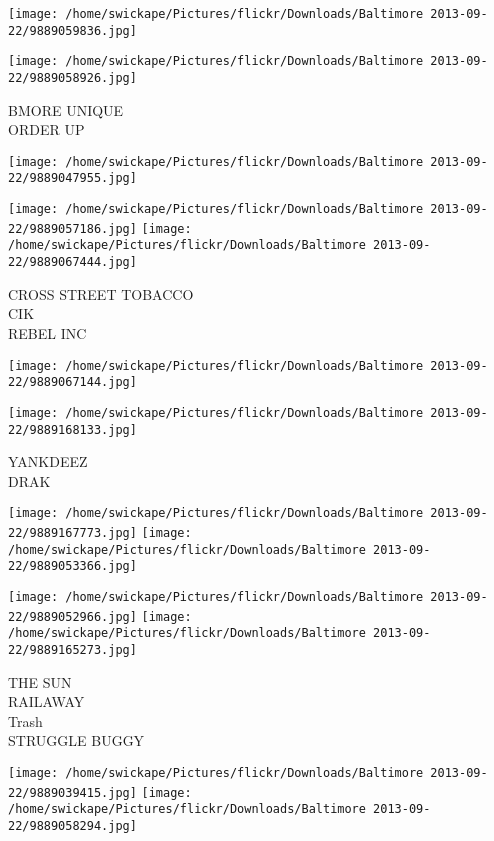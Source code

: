 \documentclass[10pt,letterpaper]{article}
\begin{document}
\texttt{[image: /home/swickape/Pictures/flickr/Downloads/Baltimore 2013-09-22/9889059836.jpg]}

\vspace{0.25in}
\texttt{[image: /home/swickape/Pictures/flickr/Downloads/Baltimore 2013-09-22/9889058926.jpg]}

BMORE UNIQUE\\
ORDER UP\\
\pagebreak

\texttt{[image: /home/swickape/Pictures/flickr/Downloads/Baltimore 2013-09-22/9889047955.jpg]}

\vspace{0.25in}
\texttt{[image: /home/swickape/Pictures/flickr/Downloads/Baltimore 2013-09-22/9889057186.jpg]}
\texttt{[image: /home/swickape/Pictures/flickr/Downloads/Baltimore 2013-09-22/9889067444.jpg]}

CROSS STREET TOBACCO\\
CIK\\
REBEL INC\\
\pagebreak

\texttt{[image: /home/swickape/Pictures/flickr/Downloads/Baltimore 2013-09-22/9889067144.jpg]}

\vspace{0.25in}
\texttt{[image: /home/swickape/Pictures/flickr/Downloads/Baltimore 2013-09-22/9889168133.jpg]}

YANKDEEZ\\
DRAK\\
\pagebreak

\texttt{[image: /home/swickape/Pictures/flickr/Downloads/Baltimore 2013-09-22/9889167773.jpg]}
\texttt{[image: /home/swickape/Pictures/flickr/Downloads/Baltimore 2013-09-22/9889053366.jpg]}

\texttt{[image: /home/swickape/Pictures/flickr/Downloads/Baltimore 2013-09-22/9889052966.jpg]}
\texttt{[image: /home/swickape/Pictures/flickr/Downloads/Baltimore 2013-09-22/9889165273.jpg]}

THE SUN\\
RAILAWAY\\
Trash\\
STRUGGLE BUGGY\\
\pagebreak

\texttt{[image: /home/swickape/Pictures/flickr/Downloads/Baltimore 2013-09-22/9889039415.jpg]}
\texttt{[image: /home/swickape/Pictures/flickr/Downloads/Baltimore 2013-09-22/9889058294.jpg]}
\end{document}
